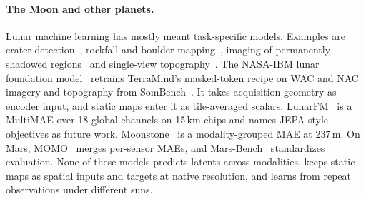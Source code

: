 \paragraph{The Moon and other planets.} Lunar machine learning has mostly meant task-specific models. Examples are crater detection~\cite{silburt2019lunar,yang2020lunar,tewari2022automated}, rockfall and boulder mapping~\cite{bickel2019automated,bickel2020impacts,aussel2025global}, imaging of permanently shadowed regions~\cite{bickel2021peering} and single-view topography~\cite{chen2022cnn,sander2026moon}. The NASA-IBM lunar foundation model~\cite{fraccaro2026multimodal} retrains TerraMind's masked-token recipe on WAC and NAC imagery and topography from SomBench~\cite{patil2026sombench}. It takes acquisition geometry as encoder input, and static maps enter it as tile-averaged scalars. LunarFM~\cite{gironamata2026lunarfm} is a MultiMAE over 18 global channels on 15\,km chips and names JEPA-style objectives as future work. Moonstone~\cite{prasad2026moonstone} is a modality-grouped MAE at 237\,m. On Mars, MOMO~\cite{purohit2026momo} merges per-sensor MAEs, and Mars-Bench~\cite{purohit2025marsbench} standardizes evaluation. None of these models predicts latents across modalities. \method keeps static maps as spatial inputs and targets at native resolution, and learns from repeat observations under different suns.
